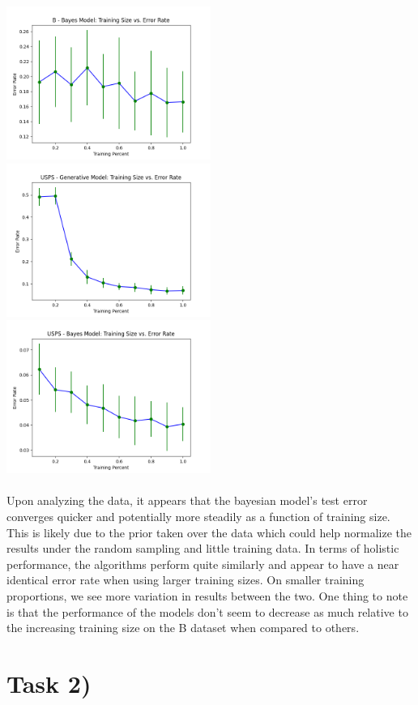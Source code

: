 \documentclass{article}
\begin{document}
\includegraphics[width=0.5\textwidth]{../output/bayes-B.png}
\includegraphics[width=0.5\textwidth]{../output/generative-USPS.png}
\includegraphics[width=0.5\textwidth]{../output/bayes-USPS.png}
\\ \\
Upon analyzing the data, it appears that the bayesian model's test error converges quicker and potentially more steadily as a function of training size. This is likely due to the prior taken over the data which could help normalize the results under the random sampling and little training data. In terms of holistic performance, the algorithms perform quite similarly and appear to have a near identical error rate when using larger training sizes. On smaller training proportions, we see more variation in results between the two. One thing to note is that the performance of the models don't seem to decrease as much relative to the increasing training size on the B dataset when compared to others.

\section*{Task 2)}
\end{document}
